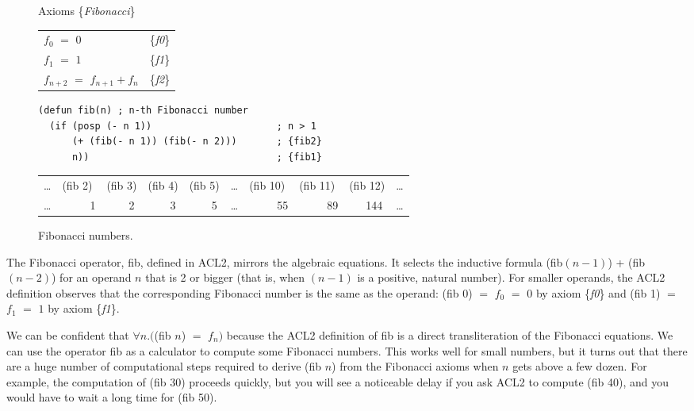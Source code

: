 \begin{figure}
\begin{center}
Axioms \{\emph{Fibonacci}\}
\begin{tabular}{ll}
$f_0$ $=$ $0$                   & \{\emph{f0}\} \\
$f_1$ $=$ $1$                   & \{\emph{f1}\} \\
$f_{n+2}$ $=$ $f_{n+1} + f_{n}$ & \{\emph{f2}\} \\
\end{tabular}
\begin{code}
\begin{verbatim}
(defun fib(n) ; n-th Fibonacci number
  (if (posp (- n 1))                      ; n > 1
      (+ (fib(- n 1)) (fib(- n 2)))       ; {fib2}
      n))                                 ; {fib1}
\end{verbatim}
\end{code}

\begin{tabular}{llllllllll}
\dots & \textsf{(fib 2)} & \textsf{(fib 3)} & \textsf{(fib 4)} & \textsf{(fib 5)} & \dots & \textsf{(fib 10)} & \textsf{(fib 11)} & \textsf{(fib 12)} & \dots \\
\dots & ~~~~~1  &  ~~~~2  &  ~~~~3  &  ~~~~5  & \dots &  ~~~~~55 &  ~~~~~89 & ~~~144   & \dots \\
\end{tabular}
\end{center}
\caption{Fibonacci numbers.}
\label{fig:Fibonacci-axioms}
\end{figure}

The Fibonacci operator, \textsf{fib}, defined in ACL2,
mirrors the algebraic equations.
It selects the inductive formula
\textsf{(fib$(n - 1)$) + (fib$(n - 2)$)}
for an operand $n$ that is 2 or bigger
(that is, when $(n-1)$ is a positive, natural number).
For smaller operands, the ACL2 definition
observes that the corresponding Fibonacci number
is the same as the operand:
\textsf{(fib 0)} $=$ $f_0$ $=$ $0$ by axiom \{\emph{f0}\}
and \textsf{(fib 1)} $=$ $f_1$ $=$ $1$ by axiom \{\emph{f1}\}.

We can be confident that $\forall n.($\textsf{(fib $n$)} $=$ $f_n)$
because the ACL2 definition of \textsf{fib} is a direct
transliteration of the Fibonacci equations.
We can use the operator \textsf{fib} as a calculator
to compute some Fibonacci numbers.
This works well for small numbers, but it turns out that there are
a huge number of computational steps required to derive
\textsf{(fib $n$)} from the Fibonacci axioms when $n$ gets above a few dozen.
For example, the computation of \textsf{(fib 30)} proceeds quickly,
but you will see a noticeable delay if you ask ACL2 to compute \textsf{(fib 40)},
and you would have to wait a long time for \textsf{(fib 50)}.

